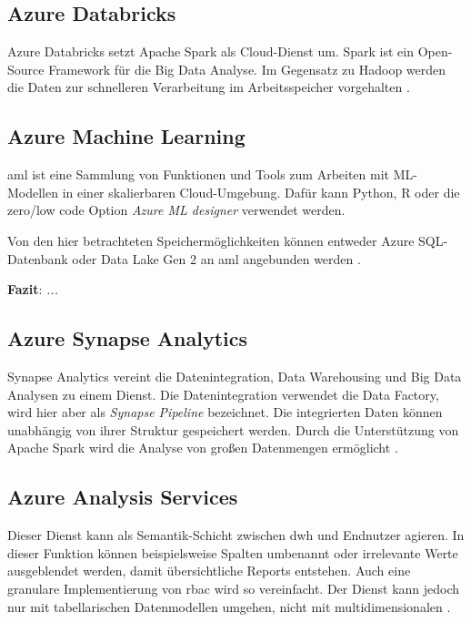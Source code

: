 \subsection{Azure Databricks} \label{sec:grundlagen:azure_dienste:databricks}
Azure Databricks setzt Apache Spark als Cloud-Dienst um. Spark ist ein Open-Source Framework für die Big Data Analyse. Im Gegensatz zu Hadoop werden die Daten zur schnelleren Verarbeitung im Arbeitsspeicher vorgehalten \cite{soh_data_2020}.

\subsection{Azure Machine Learning} \label{sec:grundlagen:azure_dienste:machineLearning}
\ac{aml} ist eine Sammlung von Funktionen und Tools zum Arbeiten mit ML-Modellen in einer skalierbaren Cloud-Umgebung. Dafür kann Python, R oder die zero/low code Option \textit{Azure ML designer} verwendet werden.

Von den hier betrachteten Speichermöglichkeiten können entweder Azure SQL-Datenbank oder Data Lake Gen 2 an \ac{aml} angebunden werden \cite{soh_data_2020}.

\textbf{Fazit}: \textit{...}

\subsection{Azure Synapse Analytics} \label{sec:grundlagen:azure_dienste:synapseAnalytics}
Synapse Analytics vereint die Datenintegration, Data Warehousing und Big Data Analysen zu einem Dienst. Die Datenintegration verwendet die Data Factory, wird hier aber als \textit{Synapse Pipeline} bezeichnet. Die integrierten Daten können unabhängig von ihrer Struktur gespeichert werden. Durch die Unterstützung von Apache Spark wird die Analyse von großen Datenmengen ermöglicht \cite{shiyal_beginning_2021}.











\subsection{Azure Analysis Services} \label{sec:grundlagen:azure_dienste:analysisServices}
Dieser Dienst kann als Semantik-Schicht zwischen \ac{dwh} und Endnutzer agieren. In dieser Funktion können beispielsweise Spalten umbenannt oder irrelevante Werte ausgeblendet werden, damit übersichtliche Reports entstehen. Auch eine granulare Implementierung von \ac{rbac} wird so vereinfacht. Der Dienst kann jedoch nur mit tabellarischen Datenmodellen umgehen, nicht mit multidimensionalen \cite{how_beyond_2020}.





